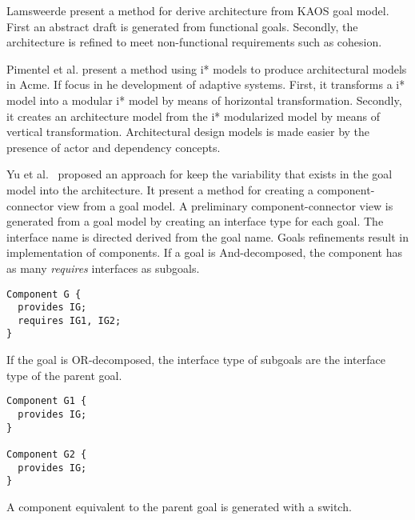 Lamsweerde \cite{van_lamsweerde_system_2003} present a method for derive architecture from KAOS goal model. First an abstract draft is generated from functional goals. Secondly, the architecture is refined to meet non-functional requirements such as cohesion.

Pimentel et al. \cite{pimentel_deriving_2012} present a method  using i* models to produce architectural models in Acme. If focus in he development of adaptive systems. First, it transforms a i* model into a modular i* model by means of horizontal transformation. Secondly, it creates an architecture model from the i* modularized model by means of vertical transformation. Architectural design models is made easier by the
presence of actor and dependency concepts.

Yu et al.~\cite{yu_goals_2008} proposed an approach for keep the variability that exists in the goal model into the architecture.
It present a method for creating a component-connector view from a goal model.
A preliminary component-connector view is generated from a goal model by creating an interface type for each goal. The interface name is directed derived from the goal name. Goals refinements result in implementation of components.
If a goal is And-decomposed, the component has as many \emph{requires} interfaces as subgoals.

\begin{lstlisting}
Component G {
  provides IG;
  requires IG1, IG2;
}
\end{lstlisting}

If the goal is OR-decomposed, the interface type of subgoals are the interface type of the parent goal.

\begin{lstlisting}
Component G1 {
  provides IG;
}

Component G2 {
  provides IG;
}
\end{lstlisting}

A component equivalent to the parent goal is generated with a switch.



